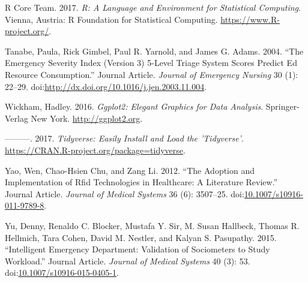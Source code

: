 \documentclass[]{elsarticle} %
\begin{document}
\hypertarget{ref-CRAN}{}
R Core Team. 2017. \emph{R: A Language and Environment for Statistical
Computing}. Vienna, Austria: R Foundation for Statistical Computing.
\url{https://www.R-project.org/}.

\hypertarget{ref-RN251}{}
Tanabe, Paula, Rick Gimbel, Paul R. Yarnold, and James G. Adams. 2004.
``The Emergency Severity Index (Version 3) 5-Level Triage System Scores
Predict Ed Resource Consumption.'' Journal Article. \emph{Journal of
Emergency Nursing} 30 (1): 22--29.
doi:\href{https://doi.org/http://dx.doi.org/10.1016/j.jen.2003.11.004}{http://dx.doi.org/10.1016/j.jen.2003.11.004}.

\hypertarget{ref-GGPLOT2}{}
Wickham, Hadley. 2016. \emph{Ggplot2: Elegant Graphics for Data
Analysis}. Springer-Verlag New York. \url{http://ggplot2.org}.

\hypertarget{ref-TIDY}{}
---------. 2017. \emph{Tidyverse: Easily Install and Load the
'Tidyverse'}. \url{https://CRAN.R-project.org/package=tidyverse}.

\hypertarget{ref-RN257}{}
Yao, Wen, Chao-Hsien Chu, and Zang Li. 2012. ``The Adoption and
Implementation of Rfid Technologies in Healthcare: A Literature
Review.'' Journal Article. \emph{Journal of Medical Systems} 36 (6):
3507--25.
doi:\href{https://doi.org/10.1007/s10916-011-9789-8}{10.1007/s10916-011-9789-8}.

\hypertarget{ref-RN253}{}
Yu, Denny, Renaldo C. Blocker, Mustafa Y. Sir, M. Susan Hallbeck, Thomas
R. Hellmich, Tara Cohen, David M. Nestler, and Kalyan S. Pasupathy.
2015. ``Intelligent Emergency Department: Validation of Sociometers to
Study Workload.'' Journal Article. \emph{Journal of Medical Systems} 40
(3): 53.
doi:\href{https://doi.org/10.1007/s10916-015-0405-1}{10.1007/s10916-015-0405-1}.
\end{document}
